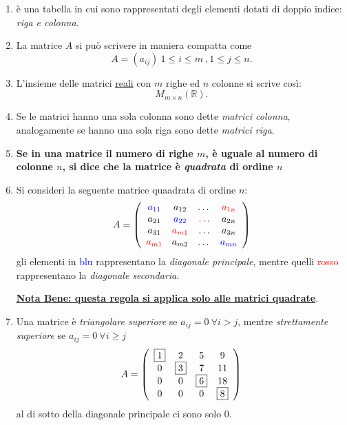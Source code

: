 \documentclass[a4paper]{article}
\newcommand{\nb}[1]{\underline{\textbf{Nota Bene: #1}}}
\newcommand{\ns}{\par \noindent}
\begin{document}
\begin{enumerate}
	\item è una tabella in cui sono rappresentati degli elementi dotati di doppio indice: \textit{riga e colonna}.
	\item La matrice $A$ si può scrivere in maniera compatta come
	\begin{equation*}
		A=(a_{ij}) \ 1\leq i \leq m \ , 1 \leq j \leq n.
	\end{equation*}
	\item L'insieme delle matrici \underline{reali} con $m$ righe ed $n$ colonne si scrive così:
	\begin{equation*}
		M_{m\times n}(\mathbb{R}).
	\end{equation*}
	\item Se le matrici hanno una sola colonna sono dette \textit{matrici colonna}, analogamente se hanno una sola riga sono dette \textit{matrici riga}.
	\item \textbf{Se in una matrice il numero di righe $ m $, è uguale al numero di colonne $ n $, si dice che la matrice è \textit{quadrata} di ordine $n$}
	\item Si consideri la seguente matrice quaadrata di ordine $n$:
	\begin{equation*}
		A=
		\left(  
		\begin{array}{cccc}
			\textcolor{blue}{a_{11}} & a_{12} & \dots&  \textcolor{red}{a_{1n}} \\
			a_{21} & \textcolor{blue}{a_{22}} & \textcolor{red}{\dots}&  a_{2n} \\
			a_{31} & \textcolor{red}{a_{m1} } & \textcolor{blue}{\dots}&  a_{3n} \\
			\textcolor{red}{a_{m1}} & a_{m2} & \dots&  \textcolor{blue}{a_{mn}}
		\end{array}\right)
	\end{equation*}
	gli elementi in \textcolor{blue}{blu} rappresentano la \textit{diagonale principale}, mentre quelli \textcolor{red}{rosso} rappresentano la \textit{diagonale secondaria}.
	\ns
	\nb{questa regola si applica solo alle matrici quadrate}.
	\item Una matrice è \textit{triangolare superiore} se $a_{ij}=0 \ \forall i>j$, mentre \textit{strettamente superiore} se $ a_{ij}=0 \ \forall i \ge j $
	\begin{equation*}
		A=
		\left(  
		\begin{array}{cccc}
			\fbox{1} & 2 & 5 & 9 \\
			0 & \fbox{3} & 7 & 11 \\
			0 & 0 & \fbox{6} & 18 \\
			0 & 0 & 0 & \fbox{8}
		\end{array}\right) 
	\end{equation*}
	al di sotto della diagonale principale ci sono solo $0$.
	

\end{enumerate}
\end{document}
